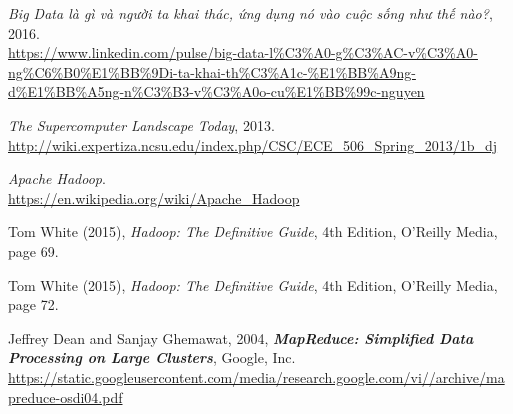 \documentclass[12pt]{report}
\begin{document}
\begin{thebibliography}{30}
\textit{Big Data là gì và người ta khai thác, ứng dụng nó vào cuộc sống như thế nào?}, 2016. \\
\url{https://www.linkedin.com/pulse/big-data-l%C3%A0-g%C3%AC-v%C3%A0-ng%C6%B0%E1%BB%9Di-ta-khai-th%C3%A1c-%E1%BB%A9ng-d%E1%BB%A5ng-n%C3%B3-v%C3%A0o-cu%E1%BB%99c-nguyen}

\textit{The Supercomputer Landscape Today}, 2013. \\
\url{http://wiki.expertiza.ncsu.edu/index.php/CSC/ECE_506_Spring_2013/1b_dj}

\textit{Apache Hadoop}. \\
\url{https://en.wikipedia.org/wiki/Apache_Hadoop}

Tom White (2015), \textit{Hadoop: The Definitive Guide}, 4th Edition, O'Reilly Media, page 69.

Tom White (2015), \textit{Hadoop: The Definitive Guide}, 4th Edition, O'Reilly Media, page 72.

Jeffrey Dean and Sanjay Ghemawat, 2004, \textbf{\it MapReduce: Simplified Data Processing on Large Clusters}, Google, Inc. \\
\url{https://static.googleusercontent.com/media/research.google.com/vi//archive/mapreduce-osdi04.pdf}

\end{thebibliography}
\end{document}
